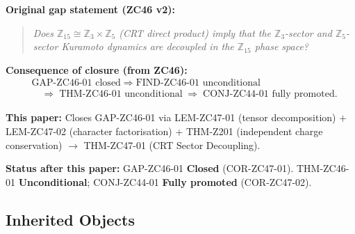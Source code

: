 \documentclass[12pt, a4paper]{article}
\begin{document}

\begin{keybox}[title={GAP-ZC46-01 (ZC46, narrowed) --- Now Closed}]
\textbf{Original gap statement (ZC46 v2):}
\begin{quote}
\emph{Does $\mathbb{Z}_{15} \cong \mathbb{Z}_3 \times \mathbb{Z}_5$
(CRT direct product) imply that the $\mathbb{Z}_3$-sector and
$\mathbb{Z}_5$-sector Kuramoto dynamics are decoupled in the
$\mathbb{Z}_{15}$ phase space?}
\end{quote}

\textbf{Consequence of closure (from ZC46):}
\begin{align*}
  &\text{GAP-ZC46-01 closed}
  \;\Rightarrow\;
  \text{FIND-ZC46-01 unconditional}\\
  &\quad\Rightarrow\;
  \text{THM-ZC46-01 unconditional}
  \;\Rightarrow\;
  \text{CONJ-ZC44-01 fully promoted.}
\end{align*}

\textbf{This paper:} Closes GAP-ZC46-01 via
LEM-ZC47-01 (tensor decomposition) $+$
LEM-ZC47-02 (character factorisation) $+$
THM-Z201 (independent charge conservation) $\to$
THM-ZC47-01 (CRT Sector Decoupling).

\textbf{Status after this paper:} GAP-ZC46-01 \textbf{Closed}
(COR-ZC47-01).
THM-ZC46-01 \textbf{Unconditional}; CONJ-ZC44-01
\textbf{Fully promoted} (COR-ZC47-02).
\end{keybox}

\subsection{Inherited Objects}

\end{document}
